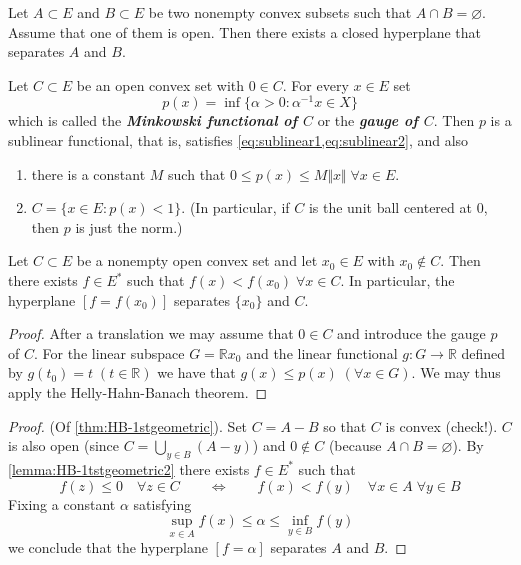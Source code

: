\documentclass{article}
\theoremstyle{definition}
\numberwithin{equation}{section}
\newcommand{\R}{\mathbb{R}}
\begin{document}
\begin{thm}\label{thm:HB-1stgeometric}
	Let $A\subset E$ and $B\subset E$ be two nonempty convex subsets such that $A\cap B=\varnothing$. Assume that one of them is open. Then there exists a closed hyperplane that separates $A$ and $B$.
\end{thm}
\begin{lemma}
	Let $C\subset E$ be an open convex set with $0\in C$. For every $x\in E$ set
	\[p(x)=\inf\{\alpha>0:\alpha^{-1}x\in X\}\]
	which is called the \textbf{\textit{Minkowski functional of $C$}} or the \textbf{\textit{gauge of $C$}}. Then $p$ is a sublinear functional, that is, satisfies \cref{eq:sublinear1,eq:sublinear2}, and also
	\begin{enumerate}
		\item there is a constant $M$ such that $0\leq p(x)\leq M\Vert x\Vert\;\forall x\in E$.
		\item $C=\{x\in E:p(x)<1\}$. (In particular, if $C$ is the unit ball centered at $0$, then $p$ is just the norm.)
	\end{enumerate}
\end{lemma}
\begin{lemma}\label{lemma:HB-1tstgeometric2}
	Let $C\subset E$ be a nonempty open convex set and let $x_0\in E$ with $x_0\notin C$. Then there exists $f\in E^*$ such that $f(x)<f(x_0)\;\forall x\in C$. In particular, the hyperplane $[f=f(x_0)]$ separates $\{x_0\}$ and $C$.
\end{lemma}
\begin{proof}
	After a translation we may assume that $0\in C$ and introduce the gauge $p$ of $C$. For the linear subspace $G=\R x_0$ and the linear functional $g:G\to\R$ defined by $g(t_0)=t\;(t\in\R)$ we have that $g(x)\leq p(x)\;(\forall x\in G)$. We may thus apply the Helly-Hahn-Banach theorem.
\end{proof}
\begin{proof}
	(Of \cref{thm:HB-1stgeometric}). Set $C=A-B$ so that $C$ is convex (check!). $C$ is also open (since $C=\bigcup_{y\in B}(A-y)$) and $0\notin C$ (because $A\cap B=\varnothing$). By \cref{lemma:HB-1tstgeometric2} there exists $f\in E^*$ such that
	\[f(z)\leq0\quad\forall z\in C\qquad\iff\qquad f(x)<f(y)\quad\forall x\in A\;\forall y\in B\]
	Fixing a constant $\alpha$ satisfying
	\[\sup_{x\in A}f(x)\leq \alpha\leq\inf_{y\in B}f(y)\]
	we conclude that the hyperplane $[f=\alpha]$ separates $A$ and $B$.
\end{proof}
\end{document}
